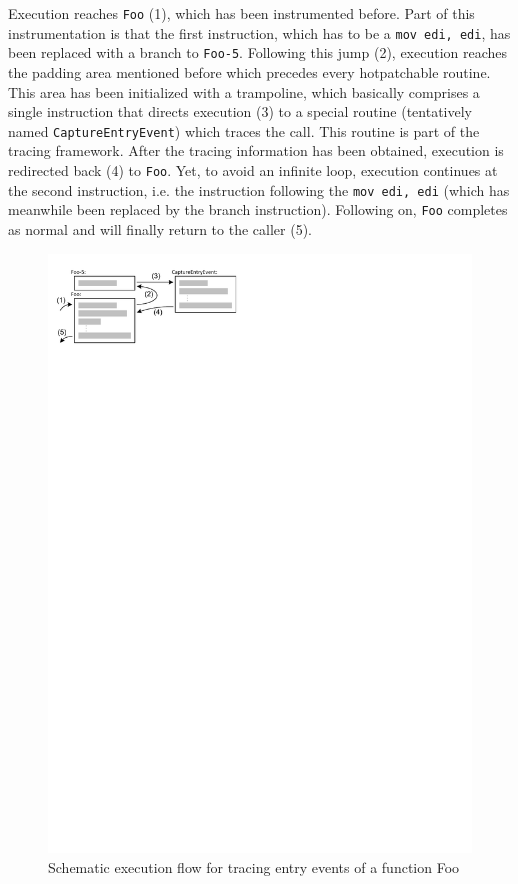 Execution reaches \verb|Foo| (1), which has been instrumented before. Part of this
instrumentation is that the first instruction, which has to be a \verb|mov edi, edi|,
has been replaced with a branch to \verb|Foo-5|. Following this jump (2), execution
reaches the padding area mentioned before which precedes every hotpatchable routine.
This area has been initialized with a trampoline, which basically comprises a
single instruction that directs execution (3) to a special routine (tentatively named
\verb|CaptureEntryEvent|) which traces the call. This
routine is part of the tracing framework. After the tracing information has been obtained,
execution is redirected back (4) to \verb|Foo|. Yet, to avoid an infinite loop, 
execution continues at the second instruction, i.e. the instruction following
the \verb|mov edi, edi| (which has meanwhile been replaced by the branch instruction).
Following on, \verb|Foo| completes as normal and will finally return to the caller (5).

	
\begin{figure}[htbp] 
\begin{centering} 
\includegraphics[scale=1, clip=true, viewport=0cm 25cm 10cm 30cm]{images/diagrams/EntryTracingSketch.pdf} 
\caption{Schematic execution flow for tracing entry events of a function Foo} 
\label{EntryTracingSketch} 
\end{centering} 
\end{figure}
	
